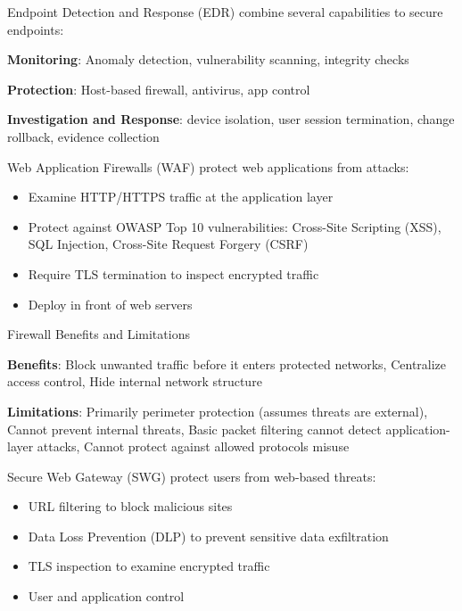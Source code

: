 \begin{concept}{Endpoint Detection and Response (EDR)}
combine several capabilities to secure endpoints:

\textbf{Monitoring}:
    Anomaly detection, vulnerability scanning, integrity checks

    \textbf{Protection}:
    Host-based firewall, antivirus, app control

    \textbf{Investigation and Response}:
    device isolation, user session termination, change rollback, evidence collection
\end{concept}


\begin{definition}{Web Application Firewalls (WAF)}
protect web applications from attacks:
\begin{itemize}
    \item Examine HTTP/HTTPS traffic at the application layer
    \item Protect against OWASP Top 10 vulnerabilities:
    Cross-Site Scripting (XSS), SQL Injection, Cross-Site Request Forgery (CSRF)
    \item Require TLS termination to inspect encrypted traffic
    \item Deploy in front of web servers
\end{itemize}
\end{definition}

\begin{theorem}{Firewall Benefits and Limitations}

    \textbf{Benefits}:
    Block unwanted traffic before it enters protected networks, Centralize access control, Hide internal network structure

\textbf{Limitations}:
Primarily perimeter protection (assumes threats are external), Cannot prevent internal threats, Basic packet filtering cannot detect application-layer attacks,
Cannot protect against allowed protocols misuse

\end{theorem}


\begin{definition}{Secure Web Gateway (SWG)}
protect users from web-based threats:
\begin{itemize}
    \item URL filtering to block malicious sites
    \item Data Loss Prevention (DLP) to prevent sensitive data exfiltration
    \item TLS inspection to examine encrypted traffic
    \item User and application control
\end{itemize}
\end{definition}

